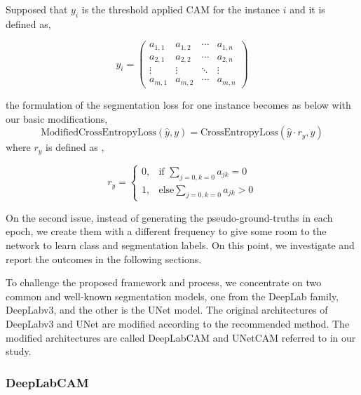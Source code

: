 \documentclass[sn-mathphys]{sn-jnl}
\theoremstyle{thmstyleone}
\theoremstyle{thmstyletwo}\newtheorem{example}{Example}\newtheorem{remark}{Remark}
\theoremstyle{thmstylethree}\newtheorem{definition}{Definition}
\begin{document}
Supposed that \(y_i\) is the threshold applied CAM for the instance \(i\) and it is defined as,

\begin{equation}
y_i = 
 \begin{pmatrix}
  a_{1,1} & a_{1,2} & \cdots & a_{1,n} \\
  a_{2,1} & a_{2,2} & \cdots & a_{2,n} \\
  \vdots  & \vdots  & \ddots & \vdots  \\
  a_{m,1} & a_{m,2} & \cdots & a_{m,n} 
 \end{pmatrix}
 \label{eq_y_i}
\end{equation}






the formulation of the segmentation loss for one instance becomes as below with our basic modifications,
\begin{equation}
\text{ModifiedCrossEntropyLoss}(\hat{y}, y) = \text{CrossEntropyLoss}(\hat{y} \cdot r_y, y)
\label{modified_loss}
\end{equation}
where \(r_y\) is defined as ,

\begin{equation}
r_y  =  \begin{cases}
                0, & \text{if } \sum_{j=0,k=0} a_{jk} = 0 \\
                1, & \text{else} \sum_{j=0,k=0} a_{jk} > 0
 \end{cases}
 \label{eq2}
\end{equation}

On the second issue, instead of generating the pseudo-ground-truths in each epoch, we create them with a different frequency to give some room to the network to learn class and segmentation labels. On this point, we investigate and report the outcomes in the following sections.

To challenge the proposed framework and process, we concentrate on two common and well-known segmentation models, one from the DeepLab family, DeepLabv3, and the other is the UNet model. The original architectures of DeepLabv3 and UNet are modified according to the recommended method. The modified architectures are called DeepLabCAM and UNetCAM referred to in our study.


\subsubsection{DeepLabCAM}
\end{document}
